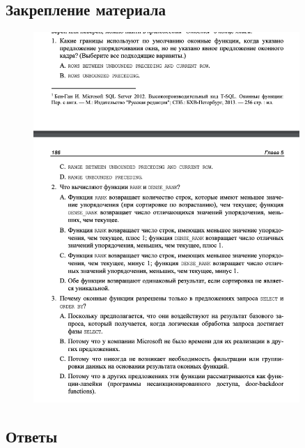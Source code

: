 \subsection*{Закрепление материала}

\begin{figure}[h!]
	\begin{center}
		\includegraphics[width=0.9\textwidth]{img/zakrep13.png}
	\end{center}
	\captionsetup{justification=centering}
\end{figure}
\clearpage

\subsection*{Ответы}

